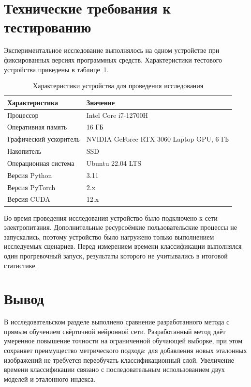 \section{Технические требования к тестированию}
Экспериментальное исследование выполнялось на одном устройстве при фиксированных версиях программных средств. Характеристики тестового устройства приведены в таблице~\ref{table:research-hardware}.

\begin{table}[!htbp]
	\centering
	\caption{Характеристики устройства для проведения исследования}
	\label{table:research-hardware}
	\footnotesize
	\renewcommand{\arraystretch}{1.2}
	\begin{tabularx}{\linewidth}{|p{5.0cm}|X|}
		\hline
		\textbf{Характеристика} & \textbf{Значение} \\
		\hline
		Процессор & Intel Core i7-12700H \\
		\hline
		Оперативная память & 16 ГБ \\
		\hline
		Графический ускоритель & NVIDIA GeForce RTX 3060 Laptop GPU, 6 ГБ \\
		\hline
		Накопитель & SSD \\
		\hline
		Операционная система & Ubuntu 22.04 LTS \\
		\hline
		Версия Python & 3.11 \\
		\hline
		Версия PyTorch & 2.x \\
		\hline
		Версия CUDA & 12.x \\
		\hline
	\end{tabularx}
\end{table}
\FloatBarrier

Во время проведения исследования устройство было подключено к сети электропитания. Дополнительные ресурсоёмкие пользовательские процессы не запускались, поэтому устройство было нагружено только выполнением исследуемых сценариев. Перед измерением времени классификации выполнялся один прогревочный запуск, результаты которого не учитывались в итоговой статистике.

\section{Вывод}
В исследовательском разделе выполнено сравнение разработанного метода с прямым обучением свёрточной нейронной сети. Разработанный метод даёт умеренное повышение точности на ограниченной обучающей выборке, при этом сохраняет преимущество метрического подхода: для добавления новых эталонных изображений не требуется переобучать классификационный слой. Увеличение времени классификации связано с последовательным использованием двух моделей и эталонного индекса.
